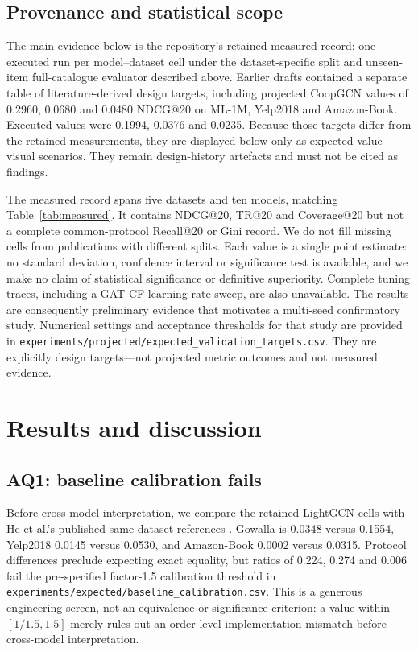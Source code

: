 \documentclass[a4paper,fleqn,longmktitle]{cas-dc}
\begin{document}
\subsection{Provenance and statistical scope}
\label{sec:provenance}

The main evidence below is the repository's retained measured record: one
executed run per model--dataset cell under the dataset-specific split and
unseen-item full-catalogue evaluator described above. Earlier drafts contained a separate table of
literature-derived design targets, including projected CoopGCN values of
0.2960, 0.0680 and 0.0480 NDCG@20 on ML-1M, Yelp2018 and Amazon-Book. Executed
values were 0.1994, 0.0376 and 0.0235. Because those targets differ from the
retained measurements, they are displayed below only as expected-value visual
scenarios. They remain design-history artefacts and must not be cited as
findings.

The measured record spans five datasets and ten models, matching
Table~\ref{tab:measured}. It contains NDCG@20, TR@20 and Coverage@20 but not a
complete common-protocol Recall@20 or Gini record. We do not fill missing cells
from publications with different splits. Each value is a single point
estimate: no standard deviation, confidence interval or significance test is
available, and we make no claim of statistical significance or definitive
superiority. Complete tuning traces, including a GAT-CF learning-rate sweep,
are also unavailable. The results are consequently preliminary evidence that
motivates a multi-seed confirmatory study. Numerical settings and acceptance
thresholds for that study are provided in
\texttt{experiments/projected/expected\_validation\_targets.csv}. They are
explicitly design targets---not projected metric outcomes and not measured
evidence.

\section{Results and discussion}
\label{sec:results}

\subsection{AQ1: baseline calibration fails}
\label{sec:measured}

Before cross-model interpretation, we compare the retained LightGCN cells with
He et al.'s published same-dataset references \citep{he2020lightgcn}. Gowalla
is 0.0348 versus 0.1554, Yelp2018 0.0145 versus 0.0530, and Amazon-Book 0.0002
versus 0.0315. Protocol differences preclude expecting exact equality, but
ratios of 0.224, 0.274 and 0.006 fail the pre-specified factor-1.5 calibration
threshold in \texttt{experiments/expected/baseline\_calibration.csv}. This is a
generous engineering screen, not an equivalence or significance criterion: a
value within $[1/1.5,1.5]$ merely rules out an order-level implementation
mismatch before cross-model interpretation.
\end{document}
